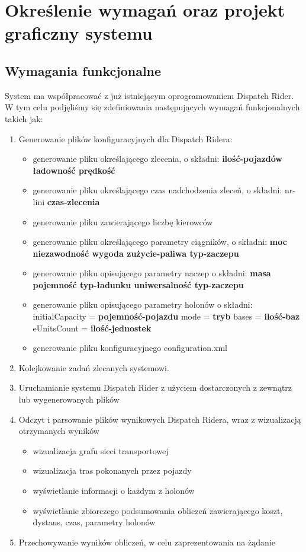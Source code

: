 \chapter{Określenie wymagań oraz projekt graficzny systemu}

\section{Wymagania funkcjonalne}
System ma współpracować z już istniejącym oprogramowaniem Dispatch Rider. W tym celu podjęliśmy się zdefiniowania następujących wymagań funkcjonalnych takich jak:

\begin{enumerate}
	\item Generowanie plików konfiguracyjnych dla Dispatch Ridera:
		\begin{itemize}
			\item generowanie pliku określającego zlecenia, o składni:
			\textbf{ilość-pojazdów ładowność prędkość}
			\item generowanie pliku określającego czas nadchodzenia zleceń, o składni: nr-lini \textbf{czas-zlecenia}
			\item generowanie pliku zawierającego liczbę kierowców
			\item generowanie pliku określającego parametry ciągników, o składni: \textbf{moc niezawodność wygoda zużycie-paliwa typ-zaczepu}
			\item generowanie pliku opisującego parametry naczep o składni: \textbf{masa pojemność typ-ładunku uniwersalność typ-zaczepu}
			\item generowanie pliku opisującego parametry holonów o składni: initialCapacity = \textbf{pojemność-pojazdu} mode = \textbf{tryb} bases = \textbf{ilość-baz} eUnitsCount = \textbf{ilość-jednostek}
			\item generowanie pliku konfiguracyjnego configuration.xml
		\end{itemize}
		
	\item Kolejkowanie zadań zlecanych systemowi.
	
	\item Uruchamianie systemu Dispatch Rider z użyciem dostarczonych z zewnątrz lub wygenerowanych plików
	
	\item Odczyt i parsowanie plików wynikowych Dispatch Ridera, wraz z wizualizacją otrzymanych wyników
		\begin{itemize}
			\item wizualizacja grafu sieci transportowej
			\item wizualizacja tras pokonanych przez pojazdy
			\item wyświetlanie informacji o każdym z holonów 
			\item wyświetlanie zbiorczego podsumowania obliczeń zawierającego koszt, dystans, czas, parametry holonów
		\end{itemize}
	\item Przechowywanie wyników obliczeń, w celu zaprezentowania na żądanie
\end{enumerate}

